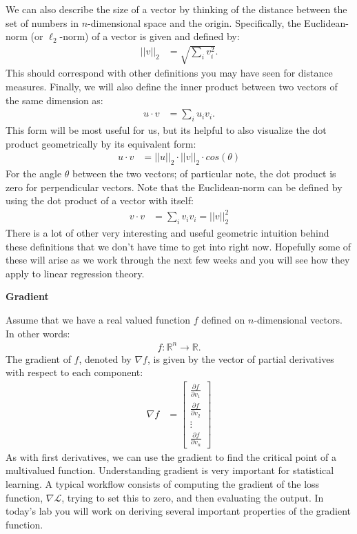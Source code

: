 \documentclass[12pt,hidelinks]{article}
\numberwithin{equation}{section}
\begin{document}
We can also describe the size of a vector by thinking of the distance between
the set of numbers in $n$-dimensional space and the origin. Specifically, the
Euclidean-norm (or $\ell_2$-norm) of a vector is given and defined by:
\begin{align}
|| v ||_2 &= \sqrt{\sum_i v_i^2}.
\end{align}
This should correspond with other definitions you may have seen for distance
measures. Finally, we will also define the inner product between two vectors
of the same dimension as:
\begin{align}
u \cdot v &= \sum_i u_i v_i.
\end{align}
This form will be most useful for us, but its helpful to also visualize the
dot product geometrically by its equivalent form:
\begin{align}
u \cdot v &= || u ||_2 \cdot || v ||_2 \cdot cos(\theta)
\end{align}
For the angle $\theta$ between the two vectors; of particular note, the dot
product is zero for perpendicular vectors. Note that the Euclidean-norm can
be defined by using the dot product of a vector with itself:
\begin{align}
v \cdot v &= \sum_i v_i v_i = || v ||_2^2
\end{align}
There is a lot of other very interesting and useful geometric intuition behind
these definitions that we don't have time to get into right now. Hopefully
some of these will arise as we work through the next few weeks and you will
see how they apply to linear regression theory.

\textbf{Gradient}

Assume that we have a real valued function $f$ defined on $n$-dimensional
vectors. In other words:
\begin{align}
f: \mathbb{R}^n \rightarrow \mathbb{R}.
\end{align}
The gradient of $f$, denoted by $\nabla f$, is given by the vector of partial
derivatives with respect to each component:
\begin{align}
\nabla f &= \begin{bmatrix} \frac{\partial f}{\partial v_1} \\
 \frac{\partial f}{\partial v_2}  \\ \vdots \\
 \frac{\partial f}{\partial v_n}  \end{bmatrix}
\end{align}
As with first derivatives, we can use the gradient to find the critical point
of a multivalued function. Understanding gradient is very important for
statistical learning. A typical workflow consists of computing the
gradient of the loss function, $\nabla \mathcal{L}$, trying to set this to
zero, and then evaluating the output. In today's lab you will work on deriving
several important properties of the gradient function.
\end{document}
